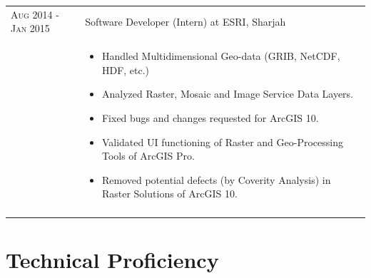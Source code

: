 \documentclass[a4paper,10pt]{article} %
\begin{document}
\begin{longtable}{l p{11cm}}
\textsc{Aug 2014 - Jan 2015} & Software Developer (Intern) at \textsc{ESRI}, Sharjah\\[-1em]
& {\footnotesize
  	\begin{itemize}
  		\setlength\itemsep{0.2em}
 		\item Handled Multidimensional Geo-data (GRIB, NetCDF, HDF, etc.)
		\item Analyzed Raster, Mosaic and Image Service Data Layers.
 		\item Fixed bugs and changes requested for ArcGIS 10.
		\item Validated UI functioning of Raster and Geo-Processing Tools of ArcGIS Pro.
		\item Removed potential defects (by Coverity Analysis) in Raster Solutions of ArcGIS 10.    
  \end{itemize}
  }\\
\multicolumn{2}{c}{} \\

\end{longtable} 
\vspace{-1.5em}


\section{Technical Proficiency}
\end{document}
